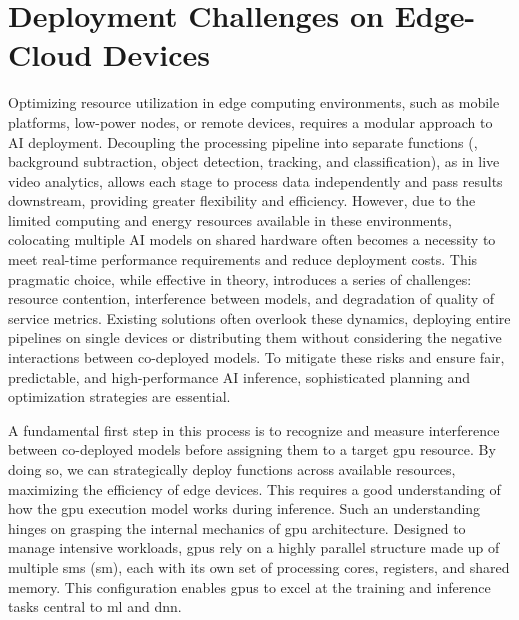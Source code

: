 \section{Deployment Challenges on Edge-Cloud Devices}

Optimizing resource utilization in edge computing environments, such as mobile platforms, low-power nodes, or remote devices, requires a modular approach to AI deployment. Decoupling the processing pipeline into separate functions (\eg, background subtraction, object detection, tracking, and classification), as in live video analytics, allows each stage to process data independently and pass results downstream, providing greater flexibility and efficiency. However, due to the limited computing and energy resources available in these environments, colocating multiple AI models on shared hardware often becomes a necessity to meet real-time performance requirements and reduce deployment costs. This pragmatic choice, while effective in theory, introduces a series of challenges: resource contention, interference between models, and degradation of quality of service metrics. Existing solutions often overlook these dynamics, deploying entire pipelines on single devices or distributing them without considering the negative interactions between co-deployed models. To mitigate these risks and ensure fair, predictable, and high-performance AI inference, sophisticated planning and optimization strategies are essential.

A fundamental first step in this process is to recognize and measure interference between co-deployed models before assigning them to a target \acrshort{gpu} resource. By doing so, we can strategically deploy functions across available resources, maximizing the efficiency of edge devices. This requires a good understanding of how the \acrshort{gpu} execution model works during inference. Such an understanding hinges on grasping the internal mechanics of \acrshort{gpu} architecture. Designed to manage intensive workloads, \acrshort{gpu}s rely on a highly parallel structure made up of multiple \acrlong{sm}s (\acrshort{sm}), each with its own set of processing cores, registers, and shared memory. This configuration enables \acrshort{gpu}s to excel at the training and inference tasks central to \acrfull{ml} and \acrfull{dnn}.

